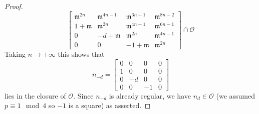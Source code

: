 \documentclass[10pt,a4paper]{amsart}
\newcommand{\cO}{\mathcal{O}}
\newcommand{\fm}{\mathfrak{m}}
\newcommand{\matr}[1]{\left[\begin{matrix}#1\end{matrix}\right]}
\newcommand{\ra}{\rightarrow}
\begin{document}
\begin{proof}
\[	\matr{
		\fm^{2n}&\fm^{4n-1}&\fm^{6n-1}&\fm^{8n-2}\\
		1+\fm&\fm^{2n}&\fm^{4n-1}&\fm^{6n-1}\\
		0&-d+\fm&\fm^{2n}&\fm^{4n-1}\\
		0&0&-1+\fm&\fm^{2n}
	}\cap\cO
	\]
	Taking $n\ra+\infty$ this shows that
	\[
	n_{-d}=\matr{0&0&0&0\\1&0&0&0\\0&-d&0&0\\0&0&-1&0}
	\]
	lies in the closure of $\cO$. Since $n_{-d}$ is already regular, we have $n_d\in\cO$ (we assumed $p\equiv 1\mod 4$ so $-1$ is a square) as asserted.
\end{proof}
\end{document}
